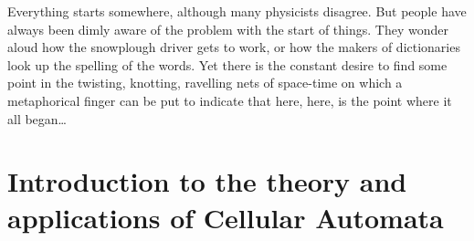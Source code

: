 
\begin{savequote}[99mm]
Everything starts somewhere, although many physicists disagree. But people have always been dimly aware of the problem with the start of things. They wonder aloud how the snowplough driver gets to work, or how the makers of dictionaries look up the spelling of the words. Yet there is the constant desire to find some point in the twisting, knotting, ravelling nets of space-time on which a metaphorical finger can be put to indicate that here, here, is the point where it all began\ldots
{}
\end{savequote}

\chapter{Introduction to the theory and applications of Cellular Automata}\label{chap:intro}

